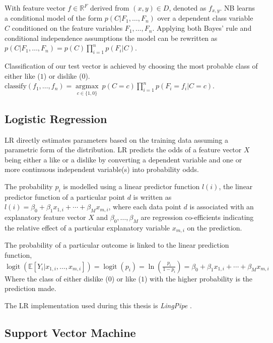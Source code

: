 With feature vector $f \in \mathbb{R}^F$ derived from $(x,y) \in D$, denoted as $f_{x,y}$. NB learns a conditional model of the form 
$p(C|F_1, \dots, F_n)$ over a dependent class variable $C$ conditioned on the feature variables $F_1, \dots, F_n$. Applying both Bayes' rule 
and conditional independence assumptions the model can be rewritten as $p(C|F_1, \dots, F_n) = p(C) \displaystyle\prod_{i=1}^n p(F_i|C)$.

Classification of our test vector is achieved by choosing the most probable class of either like ($1$) or dislike ($0$).
\\
$\mathrm{classify}(f_1,\dots,f_n) = \underset{c \in \{1,0\}}{\operatorname{argmax}} \ p(C=c) \displaystyle\prod_{i=1}^n p(F_i=f_i\vert C=c)$.

\subsection{Logistic Regression}
\label{sec:lr}

LR directly estimates parameters based on the training data assuming a parametric form of the distribution.
LR predicts the odds of a feature vector $X$ being either a like or a dislike by converting a dependent variable and 
one or more continuous independent variable(s) into probability odds.

The probability $p_i$ is modelled using a linear predictor function $l(i)$, the linear predictor function of a particular point $d$ 
is written as $l(i) = \beta_0 + \beta_1 x_{1,i} + \cdots + \beta_M x_{m,i}$, where each data point $d$ is associated with an explanatory 
feature vector $X$ and $\beta_0, \ldots, \beta_M$ are regression co-efficients indicating the relative effect of a particular 
explanatory variable $x_{m,i}$ on the prediction.

The probability of a particular outcome is linked to the linear prediction function, 
$\operatorname{logit}(\mathbb{E}[Y_i|x_{1,i},\ldots,x_{m,i}]) = \operatorname{logit}(p_i)=\ln\left(\frac{p_i}{1-p_i}\right) = \beta_0 + \beta_1 x_{1,i} + \cdots + \beta_M x_{m,i}$
Where the class of either dislike ($0$) or like ($1$) with the higher probability is the prediction made.

The LR implementation used during this thesis is \emph{LingPipe} \cite{lin}.

\subsection{Support Vector Machine}
\label{sec:svm}

